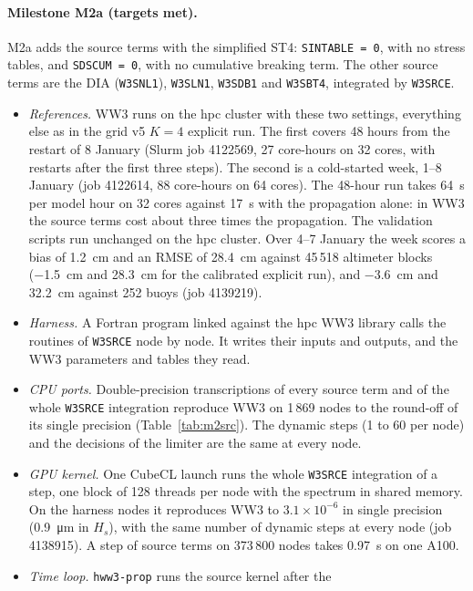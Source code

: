 \documentclass[11pt,a4paper]{article}
\begin{document}
\paragraph{Milestone M2a (targets met).} M2a adds the source terms with the
simplified ST4: \texttt{SINTABLE = 0}, with no stress tables, and
\texttt{SDSCUM = 0}, with no cumulative breaking term. The other source
terms are the DIA (\texttt{W3SNL1}), \texttt{W3SLN1}, \texttt{W3SDB1} and
\texttt{W3SBT4}, integrated by \texttt{W3SRCE}.
\begin{itemize}
\item \emph{References.} WW3 runs on the hpc cluster with these two
settings, everything else as in the grid v5 $K=4$ explicit run. The first
covers 48 hours from the restart of 8 January (Slurm job 4122569,
27 core-hours on 32 cores, with restarts after the first three steps). The
second is a cold-started week, 1--8 January (job 4122614, 88 core-hours
on 64 cores). The 48-hour run takes \SI{64}{s} per model hour on 32 cores
against \SI{17}{s} with the propagation alone: in WW3 the source terms
cost about three times the propagation. The validation scripts run
unchanged on the hpc cluster. Over 4--7 January the week scores a bias of
\SI{+1.2}{cm} and an RMSE of \SI{28.4}{cm} against 45\,518 altimeter
blocks (\SI{-1.5}{cm} and \SI{28.3}{cm} for the calibrated explicit run),
and \SI{-3.6}{cm} and \SI{32.2}{cm} against 252 buoys (job 4139219).
\item \emph{Harness.} A Fortran program linked against the hpc WW3 library
calls the routines of \texttt{W3SRCE} node by node. It writes their
inputs and outputs, and the WW3 parameters and tables they read.
\item \emph{CPU ports.} Double-precision transcriptions of every source
term and of the whole \texttt{W3SRCE} integration reproduce WW3 on 1\,869
nodes to the round-off of its single precision (Table~\ref{tab:m2src}).
The dynamic steps (1 to 60 per node) and the decisions of the limiter are
the same at every node.
\item \emph{GPU kernel.} One CubeCL launch runs the whole \texttt{W3SRCE}
integration of a step, one block of 128 threads per node with the
spectrum in shared memory. On the harness nodes it reproduces WW3 to
$3.1\times10^{-6}$ in single precision (\SI{0.9}{\micro\metre} in $H_s$),
with the same number of dynamic steps at every node (job 4138915). A step
of source terms on 373\,800 nodes takes \SI{0.97}{s} on one A100.
\item \emph{Time loop.} \texttt{hww3-prop} runs the source kernel after the

\end{itemize}
\end{document}
